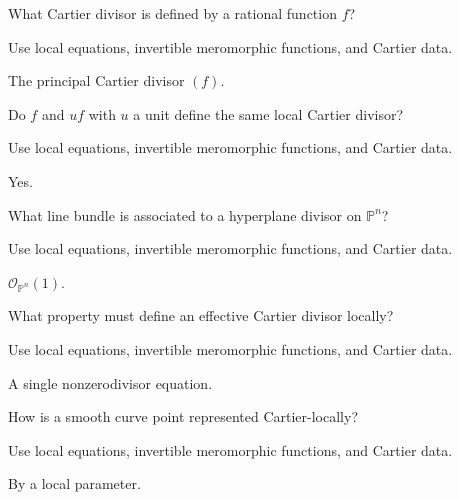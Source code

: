 \begin{exercise}\label{exr:vi40-expand-01}
What Cartier divisor is defined by a rational function $f$?
\end{exercise}
\begin{hint}
Use local equations, invertible meromorphic functions, and Cartier data.
\end{hint}
\begin{solution}
The principal Cartier divisor $(f)$.
\end{solution}

\begin{exercise}\label{exr:vi40-expand-02}
Do $f$ and $uf$ with $u$ a unit define the same local Cartier divisor?
\end{exercise}
\begin{hint}
Use local equations, invertible meromorphic functions, and Cartier data.
\end{hint}
\begin{solution}
Yes.
\end{solution}

\begin{exercise}[Hyperplane]\label{exr:vi40-expand-03}
What line bundle is associated to a hyperplane divisor on $\mathbb P^n$?
\end{exercise}
\begin{hint}
Use local equations, invertible meromorphic functions, and Cartier data.
\end{hint}
\begin{solution}
$\mathcal O_{\mathbb P^n}(1)$.
\end{solution}

\begin{exercise}\label{exr:vi40-expand-04}
What property must define an effective Cartier divisor locally?
\end{exercise}
\begin{hint}
Use local equations, invertible meromorphic functions, and Cartier data.
\end{hint}
\begin{solution}
A single nonzerodivisor equation.
\end{solution}

\begin{exercise}\label{exr:vi40-expand-05}
How is a smooth curve point represented Cartier-locally?
\end{exercise}
\begin{hint}
Use local equations, invertible meromorphic functions, and Cartier data.
\end{hint}
\begin{solution}
By a local parameter.
\end{solution}

